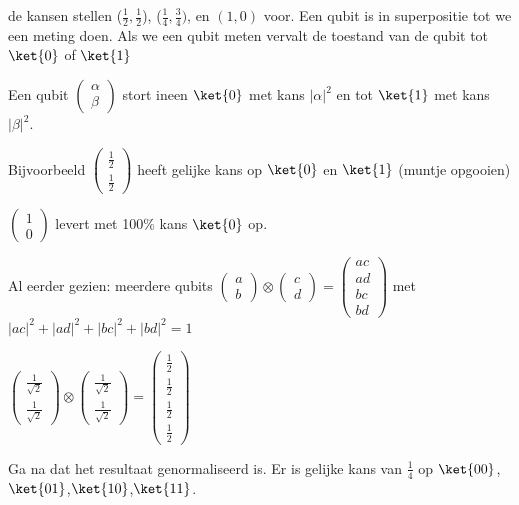 de kansen stellen ($\tfrac{1}{2}, \tfrac{1}{2}$), (${\tfrac{1}{4}, \tfrac{3}{4}})$, en $(1,0)$ voor. 
Een qubit is in superpositie tot we een meting doen. Als we een qubit meten vervalt de toestand van de qubit tot $\ket{0}$ of $\ket{1}$

Een qubit $\begin{pmatrix}
\alpha\\
\beta
\end{pmatrix}
$
stort ineen $\ket{0}$ met kans $|\alpha|^2$ en tot $\ket{1}$ met kans $|\beta|^2$.

Bijvoorbeeld 
$\begin{pmatrix}
\tfrac{1}{2}\\
\tfrac{1}{2}
\end{pmatrix}
$
heeft gelijke kans op $\ket{0}$ en $\ket{1}$ (muntje opgooien)

$\begin{pmatrix}
1\\
0
\end{pmatrix}
$
levert met 100\% kans $\ket{0}$ op.

Al eerder gezien: meerdere qubits 
$\begin{pmatrix}
a\\
b
\end{pmatrix}
\otimes
\begin{pmatrix}
c\\
d
\end{pmatrix}
=
\begin{pmatrix}
ac\\
ad\\
bc\\
bd
\end{pmatrix}
$
met $|ac|^2+|ad|^2+|bc|^2+|bd|^2=1$
 
$\begin{pmatrix}
\tfrac{1}{\sqrt{2}}\\
\tfrac{1}{\sqrt{2}}
\end{pmatrix}
\otimes
\begin{pmatrix}
\tfrac{1}{\sqrt{2}}\\
\tfrac{1}{\sqrt{2}}
\end{pmatrix}
=
\begin{pmatrix}
\tfrac{1}{2}\\
\tfrac{1}{2}\\
\tfrac{1}{2}\\
\tfrac{1}{2}
\end{pmatrix}
$

Ga na dat het resultaat genormaliseerd is.
 Er is gelijke kans van $\tfrac{1}{4}$ op $\ket{00}$, $\ket{01}$,$\ket{10}$,$\ket{11}$.

